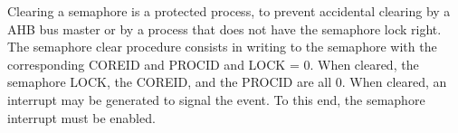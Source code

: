Clearing a semaphore is a protected process, to prevent accidental clearing by a AHB bus master or by a process that does not have the semaphore lock right. The semaphore clear procedure consists in writing to the semaphore with the corresponding COREID and PROCID and LOCK = 0. When cleared, the semaphore LOCK, the COREID, and the PROCID are all 0. When cleared, an interrupt may be generated to signal the event. To this end, the semaphore interrupt must be enabled.
